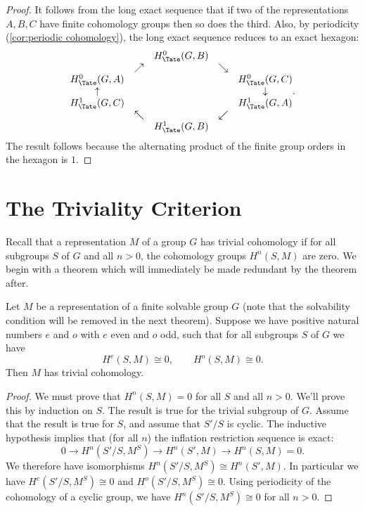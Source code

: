 \begin{proof}
  \leanok
	It follows from the long exact sequence that if two of the representations $A,B,C$
	have finite cohomology groups then so does the third.
	Also, by periodicity (\ref{cor:periodic cohomology}),
  the long exact sequence reduces to an exact hexagon:
	\[
		\begin{matrix}
			&& H^0_{\Tate}(G,B) \\
			&\nearrow && \searrow \\
			H^0_{\Tate}(G,A)  && && H^0_{\Tate}(G,C) \\
			\uparrow & & & & \downarrow \\
			H^1_{\Tate}(G,C) &&&& H^1_{\Tate}(G,A) \\
			& \nwarrow && \swarrow\\
			&& H^1_{\Tate}(G,B)
		\end{matrix}.
	\]
	The result follows because the alternating product of the
	finite group orders in the hexagon is $1$.
\end{proof}



\section{The Triviality Criterion}

Recall that a representation $M$ of a group $G$ has trivial cohomology if for all subgroups $S$ of
$G$ and all $n > 0$, the cohomology groups $H^{n}(S,M)$ are zero. We begin with a theorem
which will immediately be made redundant by the theorem after.

\begin{theorem} \label{thm:triviality criterion solvable}
	\leanok
	Let $M$ be a representation of a finite solvable group $G$ (note that the solvability
	condition will be removed in the next theorem).
	Suppose we have positive natural numbers $e$ and $o$ with $e$ even and $o$ odd,
	such that for all subgroups $S$ of $G$ we have
	\[
		H^e(S,M) \cong 0, \qquad H^o(S,M) \cong 0.
	\]
	Then $M$ has trivial cohomology.
\end{theorem}

\begin{proof}
	We must prove that $H^{n}(S,M) = 0$ for all $S$ and all $n > 0$.
	We'll prove this by induction on $S$. The result is true for the trivial subgroup of $G$.
	Assume that the result is true for $S$, and assume that $S' / S$ is cyclic.
	The inductive hypothesis implies that (for all $n$) the inflation restriction sequence is exact:
	\[
		0 \to H^{n} (S'/S, M^S) \to H^{n}(S' , M) \to H^{n}(S,M)= 0.
	\]
	We therefore have isomorphisms $H^{n} (S'/S, M^S) \cong H^{n}(S' , M)$.
	In particular we have $H^{e} (S'/S, M^S) \cong 0$ and $H^{o} (S'/S, M^S) \cong 0$.
	Using periodicity of the cohomology of a cyclic group, we have $H^{n}(S'/S,M^S) \cong 0$
	for all $n>0$.
\end{proof}

